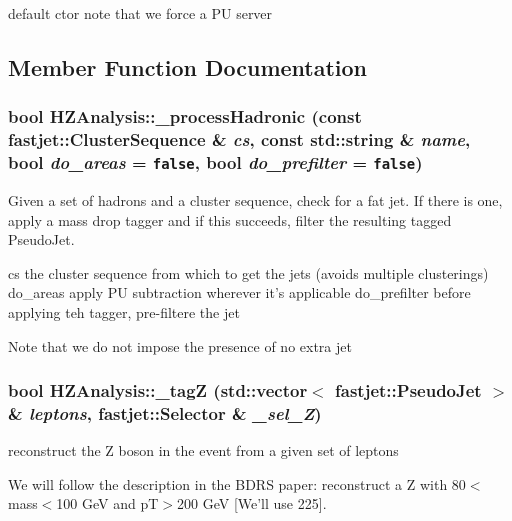 default ctor note that we force a PU server 

\subsection{Member Function Documentation}
\hypertarget{classHZAnalysis_9b58f6652dc4d1d03d513c4ab14450ee}{
\subsubsection[\_\-processHadronic]{\setlength{\rightskip}{0pt plus 5cm}bool HZAnalysis::\_\-process\-Hadronic (const fastjet::Cluster\-Sequence \& {\em cs}, const std::string \& {\em name}, bool {\em do\_\-areas} = {\tt false}, bool {\em do\_\-prefilter} = {\tt false})}}
\label{classHZAnalysis_9b58f6652dc4d1d03d513c4ab14450ee}


Given a set of hadrons and a cluster sequence, check for a fat jet. If there is one, apply a mass drop tagger and if this succeeds, filter the resulting tagged Pseudo\-Jet.

cs the cluster sequence from which to get the jets (avoids multiple clusterings) do\_\-areas apply PU subtraction wherever it's applicable do\_\-prefilter before applying teh tagger, pre-filtere the jet

Note that we do not impose the presence of no extra jet \hypertarget{classHZAnalysis_2ca8d0f2ed538de275b62f7cd8f93178}{
\subsubsection[\_\-tagZ]{\setlength{\rightskip}{0pt plus 5cm}bool HZAnalysis::\_\-tag\-Z (std::vector$<$ fastjet::Pseudo\-Jet $>$ \& {\em leptons}, fastjet::Selector \& {\em \_\-sel\_\-Z})}}
\label{classHZAnalysis_2ca8d0f2ed538de275b62f7cd8f93178}


reconstruct the Z boson in the event from a given set of leptons

We will follow the description in the BDRS paper: reconstruct a Z with 80$<$mass$<$100 Ge\-V and p\-T$>$200 Ge\-V \mbox{[}We'll use 225\mbox{]}.

